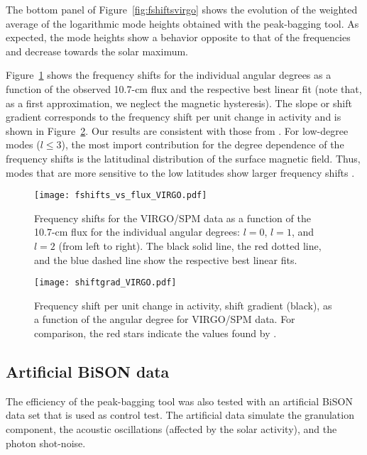 \documentclass[twocolumn]{aastex61}%
\begin{document}
The bottom panel of Figure~\ref{fig:fshiftsvirgo} shows the evolution of the weighted average of the logarithmic mode heights obtained with the peak-bagging tool. As expected, the mode heights show a behavior opposite to that of the frequencies and decrease towards the solar maximum.

Figure~\ref{fig:fluxvirgo} shows the frequency shifts for the individual angular degrees as a function of the observed 10.7-cm flux and the respective best linear fit (note that, as a first approximation, we neglect the magnetic hysteresis). The slope or shift gradient corresponds to the frequency shift per unit change in activity and is shown in Figure~\ref{fig:gradvirgo}. Our results are consistent with those from \citet{Chaplin2004}. For low-degree modes ($l\leq3$), the most import contribution for the degree dependence of the frequency shifts is the latitudinal distribution of the surface magnetic field. Thus, modes that are more sensitive to the low latitudes show larger frequency shifts \citep[e.g.][]{Chaplin2004,Broomhall2012,Salabert2015}.

\begin{figure}[h!]\centering
\texttt{[image: fshifts\_vs\_flux\_VIRGO.pdf]}
\caption{Frequency shifts for the VIRGO/SPM data as a function of the 10.7-cm flux for the individual angular degrees: $l=0$, $l=1$, and $l=2$ (from left to right). The black solid line, the red dotted line, and the blue dashed line show the respective best linear fits.}\label{fig:fluxvirgo}
\end{figure}

\begin{figure}[h!]\centering
\texttt{[image: shiftgrad\_VIRGO.pdf]}
\caption{Frequency shift per unit change in activity, shift gradient (black), as a function of the angular degree for VIRGO/SPM data. For comparison, the red stars indicate the values found by \citet{Chaplin2004}.}\label{fig:gradvirgo}
\end{figure}

\subsection{Artificial BiSON data}

The efficiency of the peak-bagging tool was also tested with an artificial BiSON data set that is used as control test. The artificial data simulate the granulation component, the acoustic oscillations (affected by the solar activity), and the photon shot-noise.
\end{document}
